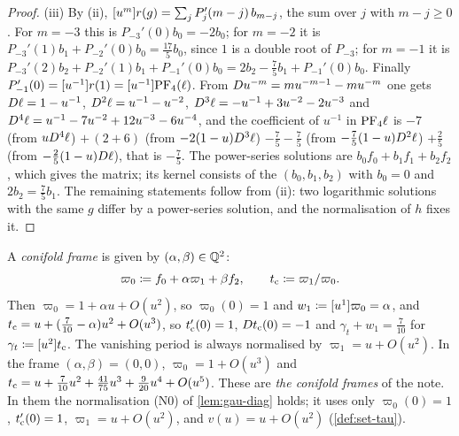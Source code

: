 \begin{proof}
(iii) By (ii), $[u^m]r(g)=\sum_jP_j'(m-j)\,b_{m-j}$, the sum over $j$ with $m-j\geq0$. For $m=-3$ this is $P_{-3}'(0)b_0=-2b_0$; for $m=-2$ it is $P_{-3}'(1)b_1+P_{-2}'(0)b_0=\frac{17}5b_0$, since $1$ is a double root of $P_{-3}$; for $m=-1$ it is $P_{-3}'(2)b_2+P_{-2}'(1)b_1+P_{-1}'(0)b_0=2b_2-\frac75b_1+P_{-1}'(0)b_0$. Finally $P_{-1}'(0)=[u^{-1}]r(1)=[u^{-1}]\mathrm{PF}_{4}(\ell)$. From $D u^{-m}=mu^{-m-1}-mu^{-m}$ one gets $D\ell=1-u^{-1}$, $D^2\ell=u^{-1}-u^{-2}$, $D^3\ell=-u^{-1}+3u^{-2}-2u^{-3}$ and $D^4\ell=u^{-1}-7u^{-2}+12u^{-3}-6u^{-4}$, and the coefficient of $u^{-1}$ in $\mathrm{PF}_{4}\ell$ is $-7$ (from $uD^4\ell$) $+\,(2+6)$ (from $-2(1-u)D^3\ell$) $-\frac75-\frac75$ (from $-\frac75(1-u)D^2\ell$) $+\frac25$ (from $-\frac25(1-u)D\ell$), that is $-\frac75$. The power-series solutions are $b_0f_0+b_1f_1+b_2f_2$, which gives the matrix; its kernel consists of the $(b_0,b_1,b_2)$ with $b_0=0$ and $2b_2=\frac75b_1$. The remaining statements follow from (ii): two logarithmic solutions with the same $g$ differ by a power-series solution, and the normalisation of $h$ fixes it.
\end{proof}

\begin{defn}
\label{def:set-frames}
A \emph{conifold frame} is given by $(\alpha,\beta)\in\mathbb{Q}^2$:
\[
\varpi_0\coloneqq f_0+\alpha\varpi_1+\beta f_2,\qquad t_{\mathrm{c}}\coloneqq\varpi_1/\varpi_0 .
\]
Then $\varpi_0=1+\alpha u+O(u^2)$, so $\varpi_0(0)=1$ and $w_1\coloneqq[u^1]\varpi_0=\alpha$, and $t_{\mathrm{c}}=u+(\frac7{10}-\alpha)u^2+O(u^3)$, so $t_{\mathrm{c}}'(0)=1$, $Dt_{\mathrm{c}}(0)=-1$ and $\gamma_t+w_1=\frac7{10}$ for $\gamma_t\coloneqq[u^2]t_{\mathrm{c}}$. The vanishing period is always normalised by $\varpi_1=u+O(u^2)$. In the frame $(\alpha,\beta)=(0,0)$, $\varpi_0=1+O(u^3)$ and $t_{\mathrm{c}}=u+\frac7{10}u^2+\frac{41}{75}u^3+\frac9{20}u^4+O(u^5)$. These are \emph{the conifold frames} of the note. In them the normalisation (N0) of \cref{lem:gau-diag} holds; it uses only $\varpi_0(0)=1$, $t_{\mathrm{c}}'(0)=1$, $\varpi_1=u+O(u^2)$, and $v(u)=u+O(u^2)$ (\cref{def:set-tau}).
\end{defn}

